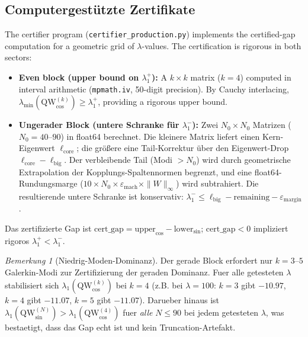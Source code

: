 \documentclass[12pt,a4paper]{article}
\theoremstyle{definition}
\theoremstyle{remark}
\newtheorem{remark}[theorem]{Bemerkung}
\begin{document}
\subsection{Computergest\"utzte Zertifikate}
\label{sec:certificates}

The certifier program (\texttt{certifier\_production.py}) implements the certified-gap computation for a geometric grid of $\lambda$-values. The certification is rigorous in both sectors:
\begin{itemize}
  \item \textbf{Even block (upper bound on $\lambda_1^+$):} A $k \times k$ matrix ($k = 4$) computed in interval arithmetic (\texttt{mpmath.iv}, 50-digit precision). By Cauchy interlacing, $\lambda_{\min}(\mathrm{QW}_{\cos}^{(k)}) \geq \lambda_1^+$, providing a rigorous upper bound.
  \item \textbf{Ungerader Block (untere Schranke für $\lambda_1^-$):} Zwei $N_0 \times N_0$ Matrizen ($N_0 = 40$--$90$) in float64 berechnet. Die kleinere Matrix liefert einen Kern-Eigenwert $\ell_{\mathrm{core}}$; die größere eine Tail-Korrektur über den Eigenwert-Drop $\ell_{\mathrm{core}} - \ell_{\mathrm{big}}$. Der verbleibende Tail (Modi $> N_0$) wird durch geometrische Extrapolation der Kopplungs-Spaltennormen begrenzt, und eine float64-Rundungsmarge ($10 \times N_0 \times \varepsilon_{\mathrm{mach}} \times \|W\|_\infty$) wird subtrahiert. Die resultierende untere Schranke ist konservativ: $\lambda_1^- \leq \ell_{\mathrm{big}} - \mathrm{remaining} - \varepsilon_{\mathrm{margin}}$.
\end{itemize}
Das zertifizierte Gap ist $\mathrm{cert\_gap} = \mathrm{upper}_{\cos} - \mathrm{lower}_{\sin}$; $\mathrm{cert\_gap} < 0$ impliziert rigoros $\lambda_1^+ < \lambda_1^-$.

\begin{remark}[Niedrig-Moden-Dominanz]
\label{rem:low-mode}
Der gerade Block erfordert nur $k = 3$--$5$ Galerkin-Modi zur Zertifizierung der geraden Dominanz. Fuer alle getesteten $\lambda$ stabilisiert sich $\lambda_1(\mathrm{QW}_{\cos}^{(k)})$ bei $k = 4$ (z.B. bei $\lambda = 100$: $k = 3$ gibt $-10.97$, $k = 4$ gibt $-11.07$, $k = 5$ gibt $-11.07$). Darueber hinaus ist $\lambda_1(\mathrm{QW}_{\sin}^{(N)}) > \lambda_1(\mathrm{QW}_{\cos}^{(4)})$ fuer \emph{alle} $N \leq 90$ bei jedem getesteten $\lambda$, was bestaetigt, dass das Gap echt ist und kein Truncation-Artefakt.
\end{remark}
\end{document}
